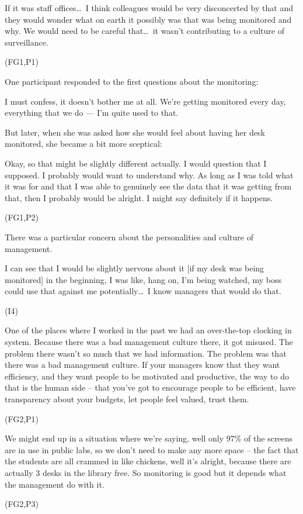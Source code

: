 \begin{qt}If it was staff offices\ldots\  I think colleagues would be
  very disconcerted by that and they would wonder what on earth it
  possibly was that was being monitored and why. We would need to be
  careful that\ldots\  it wasn’t contributing to a culture of
  surveillance.
\end{qt}
(FG1,P1)

One participant responded to the first questions about the monitoring:
 \begin{qt}I must confess, it doesn’t bother me at all. We’re getting monitored
every day, everything that we do --– I’m quite used to that.\end{qt}
But later,
when she was asked how she would feel about having her desk monitored,
she became a bit more sceptical: \begin{qt}Okay, so that might be slightly
different actually. I would question that I supposed. I probably would
want to understand why. As long as I was told what it was for and that
I was able to genuinely see the data that it was getting from that,
then I probably would be alright. I might say definitely if it
happens.\end{qt} (FG1,P2)

There was a particular concern about the personalities and culture of management.

\begin{qt}I can see that I would be slightly nervous about it [if my desk was
being monitored] in the beginning, I was like, hang on, I’m being
watched, my boss could use that against me potentially\ldots\  I know managers
that would do that.\end{qt} (I4)

\begin{qt}One of the places where I worked in the past we had an
  over-the-top clocking in system. Because there was a bad management
  culture there, it got misused. The problem there wasn’t so much that
  we had information. The problem was that there was a bad management
  culture. If your managers know that they want efficiency, and they
  want people to be motivated and productive, the way to do that is
  the human side – that you’ve got to encourage people to be
  efficient, have transparency about your budgets, let people feel
  valued, trust them.\end{qt} (FG2,P1) 

\begin{qt}We might end up in a situation where we’re saying, well only
  97\% of the screens are in use in public labs, so we don’t need to
  make any more space – the fact that the students are all crammed in
  like chickens, well it’s alright, because there are actually 3 desks
  in the library free. So monitoring is good but it depends what the
  management do with it.\end{qt} (FG2,P3) 
 
